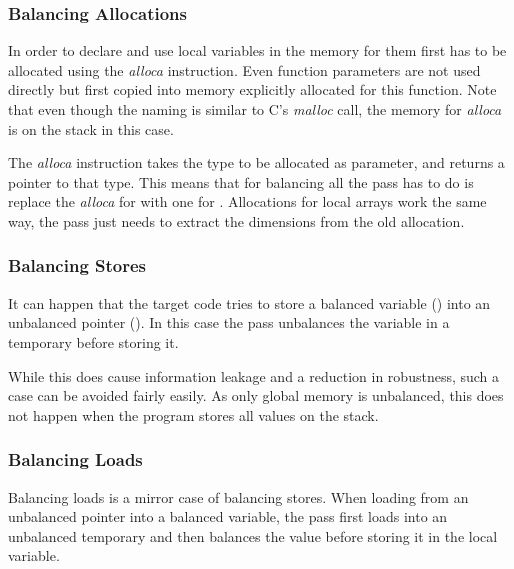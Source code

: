 \subsubsection{Balancing Allocations}
In order to declare and use local variables in \ir{} the memory for them first has to be allocated using the \emph{alloca} instruction.
Even function parameters are not used directly but first copied into memory explicitly allocated for this function.
Note that even though the naming is similar to C's \emph{malloc} call, the memory for \emph{alloca} is on the stack in this case.

The \emph{alloca} instruction takes the type to be allocated as parameter, and returns a pointer to that type.
This means that for balancing all the pass has to do is replace the \emph{alloca} for  with one for .
Allocations for local arrays work the same way, the pass just needs to extract the dimensions from the old allocation.

\subsubsection{Balancing Stores}
It can happen that the target code tries to store a balanced variable () into an unbalanced pointer ().
In this case the pass unbalances the variable in a temporary before storing it.

While this does cause information leakage and a reduction in robustness, such a case can be avoided fairly easily.
As only global memory is unbalanced, this does not happen when the program stores all values on the stack.

\subsubsection{Balancing Loads}
Balancing loads is a mirror case of balancing stores.
When loading from an unbalanced pointer into a balanced variable, the pass first loads into an unbalanced temporary and then balances the value before storing it in the local variable.


